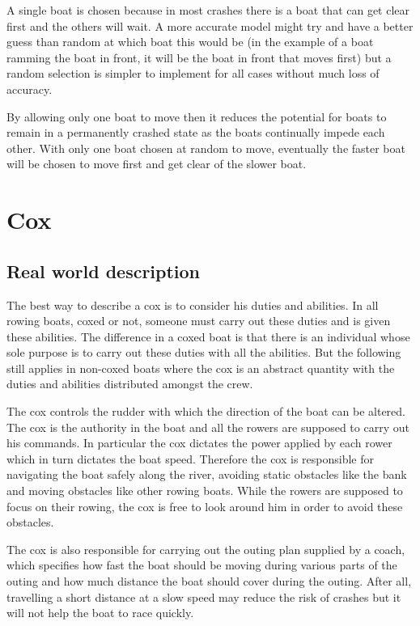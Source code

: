       A single boat is chosen because in most crashes there is a boat that can get clear first and the others will wait. A more accurate model might try and have a better guess than random at which boat this would be (in the example of a boat ramming the boat in front, it will be the boat in front that moves first) but a random selection is simpler to implement for all cases without much loss of accuracy.
      
      By allowing only one boat to move then it reduces the potential for boats to remain in a permanently crashed state as the boats continually impede each other. With only one boat chosen at random to move, eventually the faster boat will be chosen to move first and get clear of the slower boat.
      
    \section{Cox}
      \subsection{Real world description}
      The best way to describe a cox is to consider his duties and abilities. In all rowing boats, coxed or not, someone must carry out these duties and is given these abilities. The difference in a coxed boat is that there is an individual whose sole purpose is to carry out these duties with all the abilities. But the following still applies in non-coxed boats where the cox is an abstract quantity with the duties and abilities distributed amongst the crew.
      
      The cox controls the rudder with which the direction of the boat can be altered. The cox is the authority in the boat and all the rowers are supposed to carry out his commands. In particular the cox dictates the power applied by each rower which in turn dictates the boat speed. Therefore the cox is responsible for navigating the boat safely along the river, avoiding static obstacles like the bank and moving obstacles like other rowing boats. While the rowers are supposed to focus on their rowing, the cox is free to look around him in order to avoid these obstacles. 
      
      The cox is also responsible for carrying out the outing plan supplied by a coach, which specifies how fast the boat should be moving during various parts of the outing and how much distance the boat should cover during the outing. After all, travelling a short distance at a slow speed may reduce the risk of crashes but it will not help the boat to race quickly.
      
